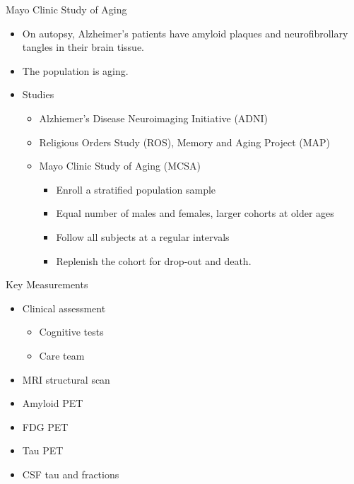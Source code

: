

\begin{frame}{Mayo Clinic Study of Aging}
  \begin{itemize}
    \item On autopsy, Alzheimer's patients have amyloid plaques and 
      neurofibrollary tangles in their brain tissue.
    \item The population is aging.
    \item Studies
      \begin{itemize}
        \item Alzhiemer's Disease Neuroimaging Initiative (ADNI)
        \item Religious Orders Study (ROS), Memory and Aging Project (MAP)
        \item Mayo Clinic Study of Aging (MCSA)
          \begin{itemize}
            \item Enroll a stratified population sample
            \item Equal number of males and females, larger cohorts at older 
              ages
            \item Follow all subjects at a regular intervals
            \item Replenish the cohort for drop-out and death.
          \end{itemize}
      \end{itemize}
  \end{itemize}
\end{frame}


\begin{frame}{Key Measurements}
  \begin{itemize}
    \item Clinical assessment
       \begin{itemize}
          \item Cognitive tests
          \item Care team
        \end{itemize}
       \pause
    \item MRI structural scan
    \item Amyloid PET
    \item FDG PET 
    \item Tau PET 
      \pause
    \item CSF tau and fractions
 \end{itemize}
\end{frame}



